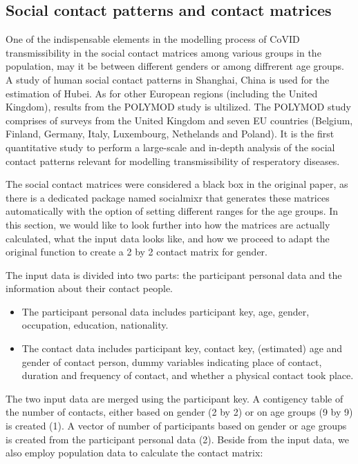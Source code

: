 \documentclass[../main.tex]{subfiles}
\begin{document}
\subsection{Social contact patterns and contact matrices}
\label{sec: ContactMatrices}

One of the indispensable elements in the modelling process of CoVID transmissibility in the social contact matrices among various groups in the population, may it be between different genders or among diffrerent age groups. A study of human social contact patterns in Shanghai, China is used for the estimation of Hubei. As for other European regions (including the United Kingdom), results from the POLYMOD study is ultilized. The POLYMOD study comprises of surveys from the United Kingdom and seven EU countries (Belgium, Finland, Germany, Italy, Luxembourg, Nethelands and Poland). It is the first quantitative study to perform a large-scale and in-depth analysis of the social contact patterns relevant for modelling transmissibility of resperatory diseases. 

The social contact matrices were considered a black box in the original paper, as there is a dedicated package named socialmixr that generates these matrices automatically with the option of setting different ranges for the age groups. In this section, we would like to look further into how the matrices are actually calculated, what the input data looks like, and how we proceed to adapt the original function to create a 2 by 2 contact matrix for gender.

The input data is divided into two parts: the participant personal data and the information about their contact people.

\begin{itemize}
    \item The participant personal data includes participant key, age, gender, occupation, education, nationality.
    \item The contact data includes participant key, contact key, (estimated) age and gender of contact person, dummy variables indicating place of contact, duration and frequency of contact, and whether a physical contact took place.
\end{itemize}

The two input data are merged using the participant key. A contigency table of the number of contacts, either based on gender (2 by 2) or on age groups (9 by 9) is created (1). A vector of number of participants based on gender or age groups is created from the participant personal data (2). Beside from the input data, we also employ population data to calculate the contact matrix:
\end{document}
